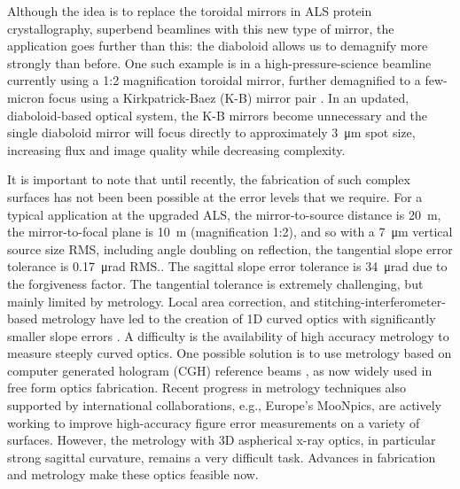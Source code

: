 \documentclass[preprint]{iucr}       %
\newcommand{\inred}[1]{{\color{red}#1}}
\begin{document}
Although the idea is to replace the toroidal mirrors in ALS protein crystallography, superbend beamlines with this new type of mirror, the application goes further than this: the diaboloid allows us to demagnify more strongly than before. One such example is in a high-pressure-science beamline currently using a 1:2 magnification toroidal mirror, further demagnified to a few-micron focus using a Kirkpatrick-Baez (K-B) mirror pair \cite{Kirkpatrick1946}. In an updated, diaboloid-based optical system, the K-B mirrors become unnecessary and the single diaboloid mirror will focus directly to approximately \SI{3}{\micro\meter} spot size, increasing flux and image quality while decreasing complexity.

It is important to note that until recently, the fabrication of such complex surfaces has not been been possible at the error levels that we require. For a typical application at the \inred{upgraded} ALS, the mirror-to-source distance is \SI{20}{\meter}\inred{, the mirror-to-focal plane is \SI{10}{\meter} (magnification 1:2)}, and so with a \SI{7}{\micro\meter} vertical source size \inred{RMS}, including angle doubling on reflection, the tangential slope error tolerance is \SI{0.17}{\micro\radian} \inred{RMS.}. The sagittal slope error tolerance is \SI{34}{\micro\radian} \inred{due to the forgiveness factor}. The tangential tolerance is extremely challenging, but mainly limited by metrology. Local area correction, and stitching-interferometer-based metrology have led to the creation of 1D curved optics with significantly smaller slope errors \cite{Yamauchi2002}. 
A difficulty is the availability of high accuracy metrology to measure steeply curved optics. One possible solution is to use metrology based on computer generated hologram (CGH) reference beams \inred{\cite{Wyant, Poleshchuk}}, as now widely used in free form optics fabrication. 
\inred{Recent progress in metrology techniques \cite{diamond2019} also supported by international collaborations, e.g.,  Europe’s MooNpics, are actively working to improve high-accuracy figure error measurements on a variety of surfaces. However, the metrology with 3D aspherical x-ray optics, in particular strong sagittal curvature, remains a very difficult task.
}
Advances in fabrication and metrology make these optics feasible now.
\end{document}
